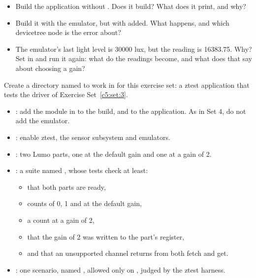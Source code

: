 \begin{itemize}
  \item Build the application without . Does it build? What does it print,
    and why?
  \item Build it with the emulator, but with  added. What happens, and which
    devicetree node is the error about?
  \item The emulator’s last light level is 30000 lux, but the reading is 16383.75. Why? Set  in  and run it again: what do the readings become, and what does that say
    about choosing a gain?
\end{itemize}

\label{c5:set:5}
Create a directory named  to work in for this exercise set: a ztest application that
tests the driver of Exercise Set~\ref{c5:set:3}.

\label{c5:ex:5.1}

\begin{itemize}
  \item {}: add the module in  to the build, and  to
    the application. As in Set 4, do not add the emulator.
  \item {}: enable ztest, the sensor subsystem and emulators.
  \item {}: two Lumo parts, one at the default gain and one at a gain of 2.
  \item {}: a suite named , whose tests check at least:
\begin{itemize}
  \item that both parts are ready,
  \item counts of 0, 1 and  at the default gain,
  \item a count at a gain of 2,
  \item that the gain of 2 was written to the part’s  register,
  \item and that an unsupported channel returns  from both fetch and get.
\end{itemize}
  \item {}: one scenario, named , allowed only on
    , judged by the ztest harness.
\end{itemize}

